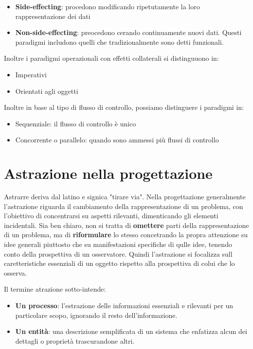 \documentclass[a4paper,18pt]{extarticle}
\begin{document}
\begin{itemize}
  \item \textbf{Side-effecting}: procedono modificando ripetutamente la loro rappresentazione dei dati
  \item \textbf{Non-side-effecting}: preocedono cerando continuamente nuovi dati. Questi paradigmi includono quelli che tradizionalmente sono detti funzionali.
\end{itemize}

Inoltre i paradigmi operazionali con effetti collaterali si distinguuono in:

\begin{itemize}
  \item Imperativi
  \item Orientati agli oggetti
\end{itemize}

Inoltre in base al tipo di flusso di controllo, possiamo distinguere i paradigmi in:
\begin{itemize}
  \item Sequenziale: il flusso di controllo è unico
  \item Concorrente o parallelo: quando sono ammessi più flussi di controllo
\end{itemize}

\newpage

\section{ Astrazione nella progettazione}

Astrarre deriva dal latino e signica "tirare via". Nella progettazione generalmente l'astrazione riguarda il cambiamento della rappresentazione di un problema, con l'obiettivo di concentrarsi su aspetti rilevanti, dimenticando gli elementi incidentali. Sia ben chiaro, non si tratta di \textbf{omettere} parti della rappresentazione di un problema, ma di \textbf{riformulare} lo stesso concetrando la propra attenzione su idee generali piuttosto che su manifestazioni specifiche di qulle idee, tenendo conto della prospettiva di un osservatore. Quindi l'astrazione si focalizza sull caretteristiche essenziali di un oggetto rispetto alla prospettiva di colui che lo osserva.

Il termine atrazione sotto-intende:
\begin{itemize}
  \item \textbf{Un processo}: l'estrazione delle informazioni essenziali e rilevanti per un particolare scopo, ignorando il resto dell'informazione.
  \item \textbf{Un entità}: una descrizione semplificata di un sistema che enfatizza alcun dei dettagli o proprietà trascurandone altri.
\end{itemize}
\end{document}
